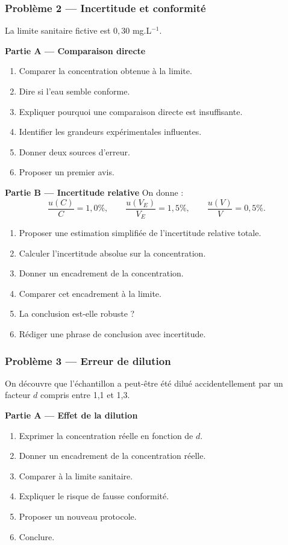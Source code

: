 \documentclass[11pt,a4paper]{article}
\begin{document}
\begin{difficile}
\subsubsection*{Problème 2 — Incertitude et conformité}

La limite sanitaire fictive est $0{,}30$ mg.L$^{-1}$.

\textbf{Partie A — Comparaison directe}
\begin{enumerate}
  \item Comparer la concentration obtenue à la limite.
  \item Dire si l'eau semble conforme.
  \item Expliquer pourquoi une comparaison directe est insuffisante.
  \item Identifier les grandeurs expérimentales influentes.
  \item Donner deux sources d'erreur.
  \item Proposer un premier avis.
\end{enumerate}

\textbf{Partie B — Incertitude relative}
On donne :
\[
\frac{u(C)}{C}=1{,}0\%,\qquad
\frac{u(V_E)}{V_E}=1{,}5\%,\qquad
\frac{u(V)}{V}=0{,}5\%.
\]
\begin{enumerate}
  \item Proposer une estimation simplifiée de l'incertitude relative totale.
  \item Calculer l'incertitude absolue sur la concentration.
  \item Donner un encadrement de la concentration.
  \item Comparer cet encadrement à la limite.
  \item La conclusion est-elle robuste ?
  \item Rédiger une phrase de conclusion avec incertitude.
\end{enumerate}

\subsubsection*{Problème 3 — Erreur de dilution}

On découvre que l'échantillon a peut-être été dilué accidentellement par un facteur $d$ compris entre 1,1 et 1,3.

\textbf{Partie A — Effet de la dilution}
\begin{enumerate}
  \item Exprimer la concentration réelle en fonction de $d$.
  \item Donner un encadrement de la concentration réelle.
  \item Comparer à la limite sanitaire.
  \item Expliquer le risque de fausse conformité.
  \item Proposer un nouveau protocole.
  \item Conclure.
\end{enumerate}


\end{difficile}
\end{document}
